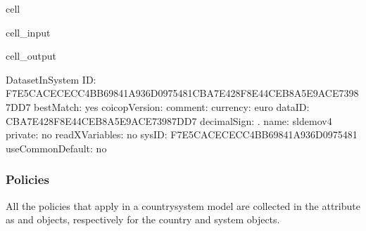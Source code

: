 \documentclass[letterpaper,10pt,english]{sphinxmanual}
\begin{document}
\begin{sphinxuseclass}{cell}
\begin{sphinxuseclass}{cell_input}
\begin{sphinxVerbatim}[commandchars=\\\{\}]
\PYG{p}{[}\PYG{p}{]}\PYG{p}{[}\PYG{p}{]}\PYG{p}{[}\PYG{p}{]}
\end{sphinxVerbatim}

\end{sphinxuseclass}
\begin{sphinxuseclass}{cell_output}
\begin{sphinxVerbatim}[commandchars=\\\{\}]
\PYGZhy{}\PYGZhy{}\PYGZhy{}\PYGZhy{}\PYGZhy{}\PYGZhy{}\PYGZhy{}\PYGZhy{}\PYGZhy{}\PYGZhy{}\PYGZhy{}\PYGZhy{}\PYGZhy{}\PYGZhy{}\PYGZhy{}\PYGZhy{}\PYGZhy{}\PYGZhy{}\PYGZhy{}\PYGZhy{}\PYGZhy{}\PYGZhy{}\PYGZhy{}\PYGZhy{}\PYGZhy{}\PYGZhy{}\PYGZhy{}\PYGZhy{}\PYGZhy{}\PYGZhy{}
DatasetInSystem
\PYGZhy{}\PYGZhy{}\PYGZhy{}\PYGZhy{}\PYGZhy{}\PYGZhy{}\PYGZhy{}\PYGZhy{}\PYGZhy{}\PYGZhy{}\PYGZhy{}\PYGZhy{}\PYGZhy{}\PYGZhy{}\PYGZhy{}\PYGZhy{}\PYGZhy{}\PYGZhy{}\PYGZhy{}\PYGZhy{}\PYGZhy{}\PYGZhy{}\PYGZhy{}\PYGZhy{}\PYGZhy{}\PYGZhy{}\PYGZhy{}\PYGZhy{}\PYGZhy{}\PYGZhy{}
	 ID: \PYGZsq{}F7E5CACE\PYGZhy{}CECC\PYGZhy{}4BB6\PYGZhy{}9841\PYGZhy{}A936D0975481CBA7E428\PYGZhy{}F8E4\PYGZhy{}4CEB\PYGZhy{}8A5E\PYGZhy{}9ACE73987DD7\PYGZsq{}
	 bestMatch: \PYGZsq{}yes\PYGZsq{}
	 coicopVersion: \PYGZsq{}\PYGZsq{}
	 comment: \PYGZsq{}\PYGZsq{}
	 currency: \PYGZsq{}euro\PYGZsq{}
	 dataID: \PYGZsq{}CBA7E428\PYGZhy{}F8E4\PYGZhy{}4CEB\PYGZhy{}8A5E\PYGZhy{}9ACE73987DD7\PYGZsq{}
	 decimalSign: \PYGZsq{}.\PYGZsq{}
	 name: \PYGZsq{}sl\PYGZus{}demo\PYGZus{}v4\PYGZsq{}
	 private: \PYGZsq{}no\PYGZsq{}
	 readXVariables: \PYGZsq{}no\PYGZsq{}
	 sysID: \PYGZsq{}F7E5CACE\PYGZhy{}CECC\PYGZhy{}4BB6\PYGZhy{}9841\PYGZhy{}A936D0975481\PYGZsq{}
	 useCommonDefault: \PYGZsq{}no\PYGZsq{}
\end{sphinxVerbatim}

\end{sphinxuseclass}
\end{sphinxuseclass}

\subsubsection{Policies}
\label{\detokenize{getstarted:policies}}
\sphinxAtStartPar
All the policies that apply in a country\sphinxhyphen{}system model are collected in the attribute  as  and  objects, respectively for the country and system objects.
\end{document}
